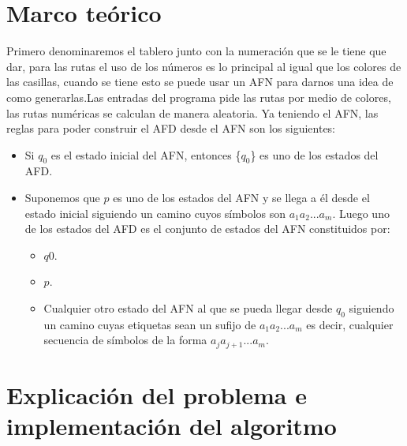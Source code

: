 \documentclass{article}
\begin{document}
\section{Marco teórico}
Primero denominaremos el tablero junto con la numeración que se le tiene que dar, para las rutas el uso de los números es lo principal al igual que los colores de las casillas, cuando se tiene esto se puede usar un AFN para darnos una idea de como generarlas.Las entradas del programa pide las rutas por medio de colores, las rutas numéricas se calculan de manera aleatoria.
Ya teniendo el AFN, las reglas para poder construir el AFD desde el AFN son los siguientes:
\begin{itemize}
    \item Si $q_0$ es el estado inicial del AFN, entonces \{$q_0$\} es uno de los estados del AFD.
    \item Suponemos que $p$ es uno de los estados del AFN y se llega a él desde el estado inicial siguiendo un camino cuyos símbolos son $a_1a_2...a_m$. Luego uno de los estados del AFD es el conjunto de estados del AFN constituidos por:
    \begin{itemize}
        \item $q0$.
        \item $p$.
        \item Cualquier otro estado del AFN al que se pueda llegar desde $q_0$ siguiendo un camino cuyas etiquetas sean un sufijo de $a_1a_2...a_m$ es decir, cualquier secuencia de símbolos de la forma $a_ja_{j+1}...a_m$.
    \end{itemize}
\end{itemize}
\section{Explicaci\'on del problema e implementaci\'on del algoritmo}
\end{document}
